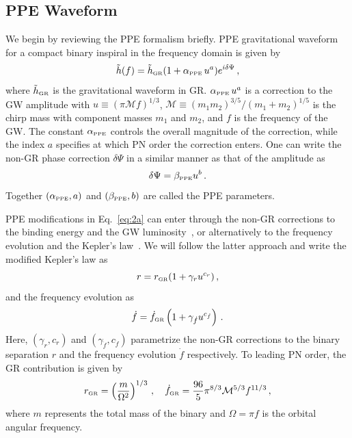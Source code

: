 \documentclass[prd,twocolumn,nofootinbib]{revtex4-1}
\newcommand{\lb}{\left(}
\newcommand{\rb}{\right)}
\newcommand{\PPE}{{\mbox{\tiny PPE}}}
\newcommand{\GR}{{\mbox{\tiny GR}}}
\begin{document}
\subsection{PPE Waveform}\label{section:ppE}
We begin by reviewing the PPE formalism briefly. PPE gravitational waveform for a compact binary inspiral in the frequency domain is given by~\cite{Yunes:2009ke}
\begin{equation}\label{eq:2a}
\tilde{h}(f)=\tilde{h}_{\GR}(1+\alpha_{\PPE}\, u^a)e^{i\delta\Psi}\,,
\end{equation}
where $\tilde{h}_{\GR}$ is the gravitational waveform in GR. $\alpha_{\PPE}\, u^a$ is a correction to the GW amplitude with $u\equiv(\pi \mathcal{M} f)^{1/3}$, $\mathcal{M}\equiv(m_1m_2)^{3/5}/(m_1+m_2)^{1/5}$ is the chirp mass with component masses $m_1$ and $m_2$, and $f$ is the frequency of the GW. The constant $\alpha_{\PPE}$ controls the overall magnitude of the correction, while the index $a$ specifies at which PN order the correction enters. One can write the non-GR phase correction $\delta\Psi$ in a similar manner as that of the amplitude as
\begin{equation}\label{eq:2b}
\delta\Psi=\beta_{\PPE} u^b\,.
\end{equation}
Together $\left(\alpha_{\PPE},a\right)$ and $\left(\beta_{\PPE},b\right)$ are called the PPE parameters.


PPE modifications in Eq.~\eqref{eq:2a} can enter through the non-GR corrections to the binding energy and the GW luminosity~\cite{Yunes:2009ke,Chatziioannou:2012rf}, or alternatively to the frequency evolution and the Kepler's law~\cite{Tahura:2018zuq}. We will follow the latter approach and write the modified Kepler's law as
\begin{equation}
 \label{eq:2c}
 r=r_{\GR}(1+\gamma_r u^{c_r})\,,
 \end{equation}
and the frequency evolution as
\begin{equation}\label{eq:2d}
\dot{f}=\dot{f}_{\GR}\left(1+\gamma_{\dot{f}}u^{c_{\dot{f}}}\right)\,.
\end{equation}
Here, $\lb\gamma_r,c_r\rb$ and $\lb\gamma_{\dot{f}},c_{\dot{f}}\rb$ parametrize the non-GR corrections to the binary separation $r$ and the frequency evolution $\dot{f}$ respectively. To leading PN order, the GR contribution is given by~\cite{cutlerflanagan,Blanchet:1995ez}
\begin{equation}
r_{\GR}=\left(\frac{m}{\Omega^2}\right)^{1/3}\,, \quad
\dot{f}_{\GR}=\frac{96}{5}\pi^{8/3}\mathcal{M}^{5/3}f^{11/3}\,,
\end{equation}
where $m$ represents the total mass of the binary and $\Omega=\pi f$ is the orbital angular frequency.
\end{document}

